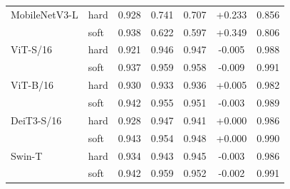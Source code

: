 \begin{table}[!htb]
{\begin{tabular}{llccccc}
MobileNetV3-L & hard & 0.928 & 0.741 & 0.707 & +0.233 & 0.856 \\
 & soft & 0.938 & 0.622 & 0.597 & +0.349 & 0.806 \\
ViT-S/16 & hard & 0.921 & 0.946 & 0.947 & -0.005 & 0.988 \\
 & soft & 0.937 & 0.959 & 0.958 & -0.009 & 0.991 \\
ViT-B/16 & hard & 0.930 & 0.933 & 0.936 & +0.005 & 0.982 \\
 & soft & 0.942 & 0.955 & 0.951 & -0.003 & 0.989 \\
DeiT3-S/16 & hard & 0.928 & 0.947 & 0.941 & +0.000 & 0.986 \\
 & soft & 0.943 & 0.954 & 0.948 & +0.000 & 0.990 \\
Swin-T & hard & 0.934 & 0.943 & 0.945 & -0.003 & 0.986 \\
 & soft & 0.942 & 0.959 & 0.952 & -0.002 & 0.991 \\
\bottomrule
\end{tabular}}
\end{table}
